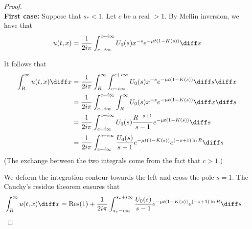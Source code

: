 \begin{proof}\text{}\\

\textbf{First case:} Suppose that $s_* < 1$. Let $c$ be a real $>1$. 
By Mellin inversion, we have that
\begin{align*}
    u(t,x) = \frac{1}{2i\pi}\int_{c-i\infty}^{c+i\infty} U_0(s) x^{-s} e^{-\mu t(1 - K(s))} \diff s
\end{align*}

It follows that
\begin{align*}
    \int_R^\infty u(t,x) \diff x 
    &= \frac{1}{2i\pi} \int_R^\infty \int_{c-i\infty}^{c+i\infty} U_0(s) x^{-s} e^{-\mu t(1 - K(s))} \diff s \diff x \\
    &= \frac{1}{2i\pi} \int_{c-i\infty}^{c+i\infty} \int_R^\infty U_0(s) x^{-s} e^{-\mu t(1 - K(s))} \diff x \diff s \\
    &= \frac{1}{2i\pi} \int_{c-i\infty}^{c+i\infty} U_0(s) \frac{R^{-s+1}}{s-1} e^{-\mu t(1 - K(s))} \diff s \\
    &= \frac{1}{2i\pi} \int_{c-i\infty}^{c+i\infty}\frac{U_0(s)}{s-1} e^{-\mu t(1 - K(s))} e^{(-s+1)\ln R} \diff s 
\end{align*}
(The exchange between the two integrals come from the fact that $c > 1$.)

We deform the integration contour towards the left and cross the pole $s = 1$. The Cauchy's residue theorem ensures that
\begin{align}
    \int_R^\infty u(t,x) \diff x &= \mathrm{Res(1)} + \frac{1}{2i\pi} \int_{s_*-i\infty}^{s_*+i\infty} \frac{U_0(s)}{s-1} e^{-\mu t(1 - K(s))} e^{(-s+1)\ln R} \diff s
    \label{eq:cauchy1}
\end{align}


\end{proof}
